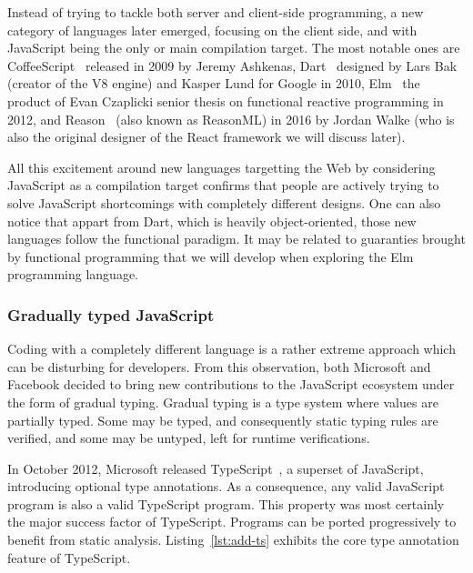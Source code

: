 Instead of trying to tackle both server and client-side programming,
a new category of languages later emerged, focusing on the client side,
and with JavaScript being the only or main compilation target.
The most notable ones are CoffeeScript~\cite{coffeescript} released in 2009
by Jeremy Ashkenas, Dart~\cite{dart-blog} designed by Lars Bak
(creator of the V8 engine) and Kasper Lund for Google in 2010,
Elm~\cite{czaplicki2013asynchronous} the product of Evan Czaplicki senior thesis
on functional reactive programming in 2012,
and Reason~\cite{reason} (also known as ReasonML) in 2016 by Jordan Walke (who is
also the original designer of the React framework we will discuss later).

All this excitement around new languages targetting the Web by considering
JavaScript as a compilation target confirms that people are actively
trying to solve JavaScript shortcomings with completely different designs.
One can also notice that appart from Dart, which is heavily object-oriented,
those new languages follow the functional paradigm.
It may be related to guaranties brought by functional programming
that we will develop when exploring the Elm programming language.

\subsubsection{Gradually typed JavaScript}%
\label{ssub:gradually_typed_javascript}

Coding with a completely different language is a rather extreme approach
which can be disturbing for developers.
From this observation, both Microsoft and Facebook decided to bring
new contributions to the JavaScript ecosystem under the form of gradual typing.
Gradual typing is a type system where values are partially typed.
Some may be typed, and consequently static typing rules are verified,
and some may be untyped, left for runtime verifications.

In October 2012, Microsoft released TypeScript~\cite{bierman2014understanding},
a superset of JavaScript, introducing optional type annotations.
As a consequence, any valid JavaScript program is also a valid TypeScript program.
This property was most certainly the major success factor of TypeScript.
Programs can be ported progressively to benefit from static analysis.
Listing~\ref{lst:add-ts} exhibits the core type annotation feature of TypeScript.



